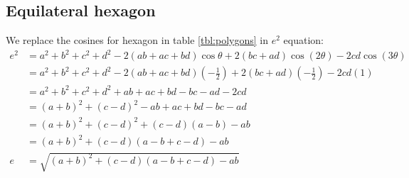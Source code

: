 \documentclass[11pt]{article}
\begin{document}
\subsection{Equilateral hexagon}

We replace the cosines for hexagon in table \ref{tbl:polygons} in $e^2$ equation:
\begin{align}
e^2 &= a^2 +b^2 +c^2 +d^2 -2(ab+ac+bd)\cos\theta +2(bc+ad)\cos(2\theta) -2cd\cos(3\theta) \nonumber\\
 &= a^2 +b^2 +c^2 +d^2 -2(ab+ac+bd)\left(-\frac{1}{2}\right) +2(bc+ad)\left(-\frac{1}{2}\right) -2cd(1) \nonumber\\
 &= a^2 +b^2 +c^2 +d^2 +ab+ac+bd -bc-ad-2cd \nonumber\\
 &= (a+b)^2 +(c-d)^2 -ab+ac+bd-bc-ad\nonumber\\
 &= (a+b)^2 +(c-d)^2 +(c-d)(a-b) -ab \nonumber\\
 &= (a+b)^2 +(c-d)(a-b+c-d) -ab \nonumber\\
e &= \sqrt{(a+b)^2 +(c-d)(a-b+c-d) -ab}
\end{align} 
\end{document}
